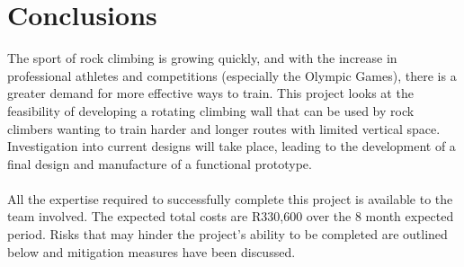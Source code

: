 \chapter{Conclusions}

The sport of rock climbing is growing quickly, and with the increase in professional athletes and competitions (especially the Olympic Games), there is a greater demand for more effective ways to train. This project looks at the feasibility of developing a rotating climbing wall that can be used by rock climbers wanting to train harder and  longer routes with limited vertical space. Investigation into current designs will take place, leading to the development of a final design and manufacture of a functional prototype. \\\\
All the expertise required to successfully complete this project is available to the team involved. The expected total costs are R330,600 over the 8 month expected period. Risks that may hinder the project's ability to be completed are outlined below and mitigation measures have been discussed.